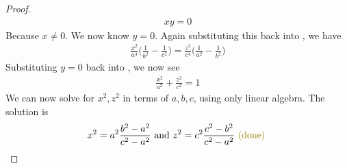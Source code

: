 \documentclass{report}
\begin{document}
\begin{proof}
\begin{align*}
xy=0
\end{align*}
Because $x\neq 0$. We now know $y=0$. Again substituting this back into , we have 
\begin{align*}
\frac{x^2}{a^4}\Big(\frac{1}{b^2}-\frac{1}{c^2} \Big)= \frac{z^2}{c^4} \Big(\frac{1}{a^2}-\frac{1}{b^2} \Big)
\end{align*}
Substituting $y=0$ back into  , we now see 
\begin{align*}
\frac{x^2}{a^2}+ \frac{z^2}{c^2}=1
\end{align*}
We can now solve for $x^2,z^2$ in terms of  $a,b,c$, using only linear algebra. The solution is 
 \begin{align*}
x^2= a^2 \frac{b^2-a^2}{c^2-a^2}\text{ and }z^2= c^2\frac{c^2-b^2}{c^2-a^2} \odone
\end{align*}
\end{proof}
\end{document}
